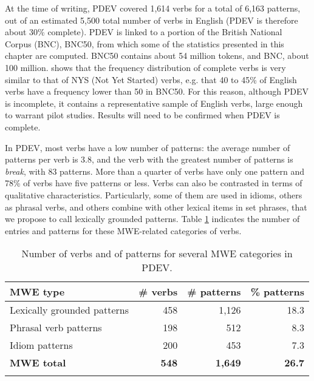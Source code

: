 \documentclass[output=paper]{langsci/langscibook}
\begin{document}
\newpage 
At the time of writing, PDEV covered 1,614 verbs for a total of 6,163
patterns, out of an estimated 5,500 total number of verbs in English
(PDEV is therefore about 30\% complete). PDEV is linked to a portion of
the British National Corpus (BNC), BNC50, from which some of the statistics presented in this
chapter are computed. BNC50 contains about 54 million tokens, and BNC,
about 100 million.  shows that the frequency distribution of
complete verbs is very similar to that of NYS (Not Yet Started) verbs,
e.g. that 40 to 45\% of English verbs have a frequency lower than 50 in
BNC50. For this reason, although PDEV is incomplete, it contains a
representative sample of English verbs, large enough to warrant pilot
studies. Results will need to be confirmed when PDEV is complete.



In PDEV, most verbs have a low number of patterns: the average number of
patterns per verb is 3.8, and the verb with the greatest number of
patterns is \textit{break}, with 83 patterns. More than a
quarter of verbs have only one pattern and 78\% of verbs have five
patterns or less. Verbs can also be contrasted in terms of qualitative
characteristics. Particularly, some of them are used in idioms, others
as phrasal verbs, and others combine with other lexical items in set
phrases, that we propose to call lexically grounded patterns. Table \ref{PDEVcat}
indicates the number of entries and patterns for these MWE-related
categories of verbs.

\begin{table}
\begin{tabular}{lrrr}
\lsptoprule
\textbf{MWE type} & \textbf{\# verbs} & \# \textbf{patterns} & \textbf{\% patterns}\\
\midrule
Lexically grounded patterns & 458 & 1,126 & 18.3 \\
Phrasal verb patterns & 198 & 512 & 8.3 \\
Idiom patterns & 200 & 453 & 7.3 \\
\textbf{MWE total} & \textbf{548} & \textbf{1,649} & \textbf{26.7} \\
\lspbottomrule
\end{tabular}
\caption{Number of verbs and of patterns for several MWE categories in PDEV.}
\label{PDEVcat}
\end{table}
\end{document}
